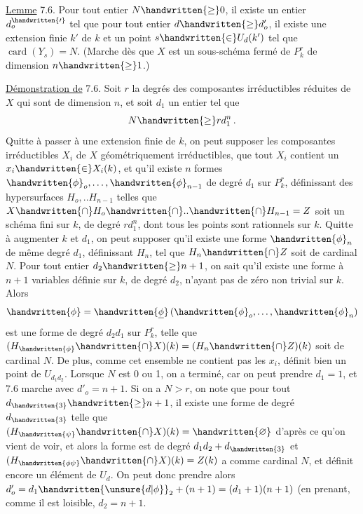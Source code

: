 \uline{Lemme} 7.6. Pour tout entier $N\handwritten{\geq}0$, il existe un entier $d^{\handwritten{\prime}}_o$  tel que pour tout entier $d\handwritten{\geq}d'_o$, il existe une extension finie $k'$ de $k$ et un point $s\handwritten{\in}U_d(k')$ tel que $\operatorname{card}(Y_s)=N$. (Marche dès que $X$ est un sous-schéma fermé de $P^r_k$ de dimension $n\handwritten{\geq}1$.)

\uline{Démonstration de} 7.6.  Soit $r$ la  degrés des composantes irréductibles réduites de $X$ qui sont de dimension $n$, et soit $d_1$ un entier tel que
\[
N\handwritten{\geq}rd_1^n\,.
\]
Quitte à passer à une extension finie de $k$, on peut supposer  les composantes irréductibles $X_i$ de $X$ géométriquement irréductibles, que tout $X_i$ contient un $x_i\handwritten{\in}X_i(k)$, et qu'il existe $n$ formes $\handwritten{\phi}_o,\ldots,\handwritten{\phi}_{n-1}$ de degré $d_1$ sur $P^r_k$,
définissant des hypersurfaces $H_o,..H_{n-1}$ telles que $X\handwritten{\cap}H_o\handwritten{\cap}..\handwritten{\cap}H_{n-1}=Z$ soit un schéma fini  sur $k$, de degré $rd_1^n$, dont tous les points sont rationnels sur $k$. Quitte à augmenter $k$ et $d_1$, on peut supposer qu'il existe une forme $\handwritten{\phi}_n$ de même degré $d_1$, définissant $H_n$, tel que $H_n\handwritten{\cap}Z$ soit de cardinal $N$. Pour tout entier $d_2\handwritten{\geq}n+1$, on sait qu'il existe une forme \handwritten{$\underline{\phi}$} à $n+1$ variables  définie sur $k$, de degré $d_2$,  n'ayant pas de zéro non trivial sur $k$. Alors
\[
\handwritten{\phi}=\handwritten{\underline{\phi}}\,(\handwritten{\phi}_o,\ldots,\handwritten{\phi}_n)
\]
est une forme de degré $d_2d_1$ sur $P^r_k$, telle que $(H_{\handwritten{\phi}}\handwritten{\cap}X)(k)=(H_n\handwritten{\cap}Z)(k)$ soit de cardinal $N$. De plus, comme cet ensemble ne contient pas les $x_i$, \handwritten{$\phi$} définit bien un point de $U_{d_1d_2}$. Lorsque $N$ est 0 ou 1, on a terminé, car on peut prendre $d_1=1$, et 7.6 marche avec $d'_o=n+1$. Si on a $N>r$, on note que pour tout $d_{\handwritten{3}}\handwritten{\geq}n+1$, il existe une forme \handwritten{$\unsure{\psi|\mu}$} de degré $d_{\handwritten{3}}$  telle que $(H_{\handwritten{\psi}}\handwritten{\cap}X)(k)=\handwritten{\varnothing}$ d'après ce qu'on vient de voir, et alors la forme \handwritten{$\phi\ \psi$} est de degré  $d_1d_2+d_{\handwritten{3}}$ et $(H_{\handwritten{\phi\psi}}\handwritten{\cap}X)(k)=Z(k)$ a comme cardinal $N$, et \handwritten{$\phi\psi$} définit encore un élément de $U_d$. On peut donc prendre alors $d'_o=d_1\handwritten{\unsure{d|\phi}}_2+(n+1)=(d_1+1)(n+1)$ (en prenant, comme il est loisible, $d_2=n+1$.

